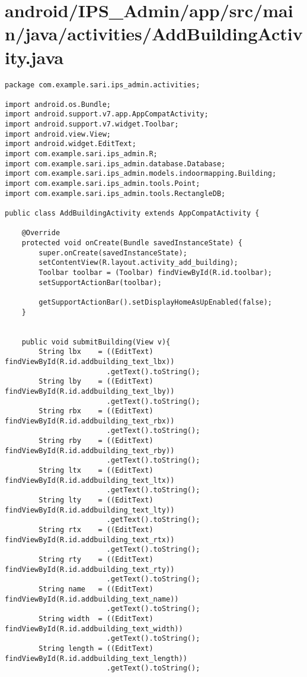 \section{android/IPS\_Admin/app/src/main/java/activities/AddBuildingActivity.java}
\begin{lstlisting}package com.example.sari.ips_admin.activities;

import android.os.Bundle;
import android.support.v7.app.AppCompatActivity;
import android.support.v7.widget.Toolbar;
import android.view.View;
import android.widget.EditText;
import com.example.sari.ips_admin.R;
import com.example.sari.ips_admin.database.Database;
import com.example.sari.ips_admin.models.indoormapping.Building;
import com.example.sari.ips_admin.tools.Point;
import com.example.sari.ips_admin.tools.RectangleDB;

public class AddBuildingActivity extends AppCompatActivity {

    @Override
    protected void onCreate(Bundle savedInstanceState) {
        super.onCreate(savedInstanceState);
        setContentView(R.layout.activity_add_building);
        Toolbar toolbar = (Toolbar) findViewById(R.id.toolbar);
        setSupportActionBar(toolbar);

        getSupportActionBar().setDisplayHomeAsUpEnabled(false);
    }


    public void submitBuilding(View v){
        String lbx    = ((EditText) findViewById(R.id.addbuilding_text_lbx))
                        .getText().toString();
        String lby    = ((EditText) findViewById(R.id.addbuilding_text_lby))
                        .getText().toString();
        String rbx    = ((EditText) findViewById(R.id.addbuilding_text_rbx))
                        .getText().toString();
        String rby    = ((EditText) findViewById(R.id.addbuilding_text_rby))
                        .getText().toString();
        String ltx    = ((EditText) findViewById(R.id.addbuilding_text_ltx))
                        .getText().toString();
        String lty    = ((EditText) findViewById(R.id.addbuilding_text_lty))
                        .getText().toString();
        String rtx    = ((EditText) findViewById(R.id.addbuilding_text_rtx))
                        .getText().toString();
        String rty    = ((EditText) findViewById(R.id.addbuilding_text_rty))
                        .getText().toString();
        String name   = ((EditText) findViewById(R.id.addbuilding_text_name))
                        .getText().toString();
        String width  = ((EditText) findViewById(R.id.addbuilding_text_width))
                        .getText().toString();
        String length = ((EditText) findViewById(R.id.addbuilding_text_length))
                        .getText().toString();


\end{lstlisting}
